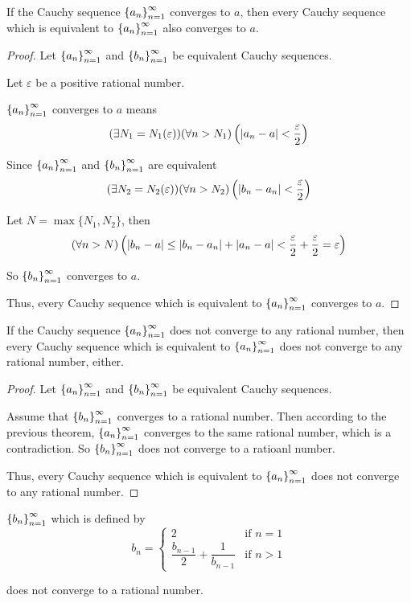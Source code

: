 \begin{theorem}
    If the Cauchy sequence ${\left\{{a_{n}}\right\}}^{\infty}_{n=1}$ converges to $a$, then every Cauchy sequence which is equivalent to ${\left\{{a_{n}}\right\}}^{\infty}_{n=1}$ also converges to $a$.
\end{theorem}

\begin{proof}
    Let ${\left\{{a_{n}}\right\}}^{\infty}_{n=1}$ and ${\left\{{b_{n}}\right\}}^{\infty}_{n=1}$ be equivalent Cauchy sequences.

    Let $\varepsilon$ be a positive rational number.

    ${\left\{{a_{n}}\right\}}^{\infty}_{n=1}$ converges to $a$ means
    \[
        (\exists N_{1}=N_{1}(\varepsilon))(\forall n > N_{1})\left(\left\vert{a_{n} - a}\right\vert < \frac{\varepsilon}{2}\right)
    \]

    Since ${\left\{{a_{n}}\right\}}^{\infty}_{n=1}$ and ${\left\{{b_{n}}\right\}}^{\infty}_{n=1}$ are equivalent
    \[
        (\exists N_{2}=N_{2}(\varepsilon))(\forall n > N_{2})\left(\left\vert{b_{n} - a_{n}}\right\vert < \frac{\varepsilon}{2}\right)
    \]

    Let $N = \max\{ N_{1}, N_{2} \}$, then
    \[
        (\forall n > N)\left(\left\vert{b_{n} - a}\right\vert \le \left\vert{b_{n} - a_{n}}\right\vert + \left\vert{a_{n} - a}\right\vert < \frac{\varepsilon}{2} + \frac{\varepsilon}{2} = \varepsilon\right)
    \]

    So ${\left\{{b_{n}}\right\}}^{\infty}_{n=1}$ converges to $a$.

    Thus, every Cauchy sequence which is equivalent to ${\left\{{a_{n}}\right\}}^{\infty}_{n=1}$ converges to $a$.
\end{proof}

\begin{corollary}
    If the Cauchy sequence ${\left\{{a_{n}}\right\}}^{\infty}_{n=1}$ does not converge to any rational number, then every Cauchy sequence which is equivalent to ${\left\{{a_{n}}\right\}}^{\infty}_{n=1}$ does not converge to any rational number, either.
\end{corollary}

\begin{proof}
    Let ${\left\{{a_{n}}\right\}}^{\infty}_{n=1}$ and ${\left\{{b_{n}}\right\}}^{\infty}_{n=1}$ be equivalent Cauchy sequences.

    Assume that ${\left\{{b_{n}}\right\}}^{\infty}_{n=1}$ converges to a rational number. Then according to the previous theorem, ${\left\{{a_{n}}\right\}}^{\infty}_{n=1}$ converges to the same rational number, which is a contradiction. So ${\left\{{b_{n}}\right\}}^{\infty}_{n=1}$ does not converge to a ratioanl number.

    Thus, every Cauchy sequence which is equivalent to ${\left\{{a_{n}}\right\}}^{\infty}_{n=1}$ does not converge to any rational number.
\end{proof}

\begin{example}
    ${\left\{{b_{n}}\right\}}^{\infty}_{n=1}$ which is defined by
    \[
        b_{n} =
        \begin{cases}
            2                                       & \text{if $n = 1$} \\
            \dfrac{b_{n-1}}{2} + \dfrac{1}{b_{n-1}} & \text{if $n > 1$}
        \end{cases}
    \]

    does not converge to a rational number.
\end{example}

